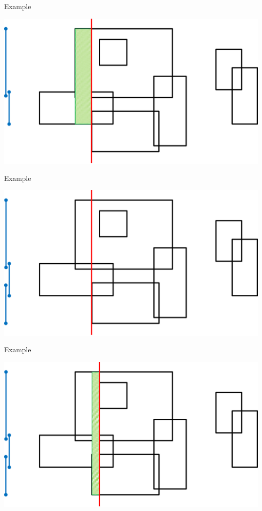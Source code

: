\documentclass[13pt,onlymath]{beamer}
\begin{document}
\begin{frame}{Example}
\begin{center}
\includegraphics[height=0.6\textheight]{figures/sweep5}
\end{center}
\end{frame}

\begin{frame}{Example}
\begin{center}
\includegraphics[height=0.6\textheight]{figures/sweep6}
\end{center}
\end{frame}

\begin{frame}{Example}
\begin{center}
\includegraphics[height=0.6\textheight]{figures/sweep7}
\end{center}
\end{frame}
\end{document}
